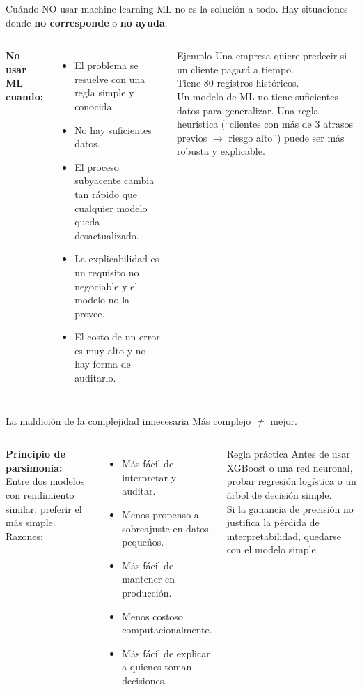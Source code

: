 \documentclass[aspectratio=169]{beamer}
\begin{document}
\begin{frame}{Cuándo NO usar machine learning}
  ML no es la solución a todo. Hay situaciones donde \textbf{no corresponde} o \textbf{no ayuda}.

  \bigskip
  \begin{columns}
      \textbf{No usar ML cuando:}
      \begin{itemize}
        \item El problema se resuelve con una regla simple y conocida.
        \item No hay suficientes datos.
        \item El proceso subyacente cambia tan rápido que cualquier modelo queda desactualizado.
        \item La explicabilidad es un requisito no negociable y el modelo no la provee.
        \item El costo de un error es muy alto y no hay forma de auditarlo.
      \end{itemize}
      \begin{exampleblock}{Ejemplo}
        Una empresa quiere predecir si un cliente pagará a tiempo.\\
        Tiene 80 registros históricos.\\
        \bigskip
        Un modelo de ML no tiene suficientes datos para generalizar. Una regla heurística (``clientes con más de 3 atrasos previos $\rightarrow$ riesgo alto'') puede ser más robusta y explicable.
      \end{exampleblock}
  \end{columns}
\end{frame}

\begin{frame}{La maldición de la complejidad innecesaria}
  Más complejo $\neq$ mejor.

  \bigskip
  \begin{columns}
      \textbf{Principio de parsimonia:}\\
      Entre dos modelos con rendimiento similar, preferir el más simple. Razones:
      \begin{itemize}
        \item Más fácil de interpretar y auditar.
        \item Menos propenso a sobreajuste en datos pequeños.
        \item Más fácil de mantener en producción.
        \item Menos costoso computacionalmente.
        \item Más fácil de explicar a quienes toman decisiones.
      \end{itemize}
      \begin{alertblock}{Regla práctica}
        Antes de usar XGBoost o una red neuronal, probar regresión logística o un árbol de decisión simple.\\
        Si la ganancia de precisión no justifica la pérdida de interpretabilidad, quedarse con el modelo simple.
      \end{alertblock}
  \end{columns}
\end{frame}
\end{document}
